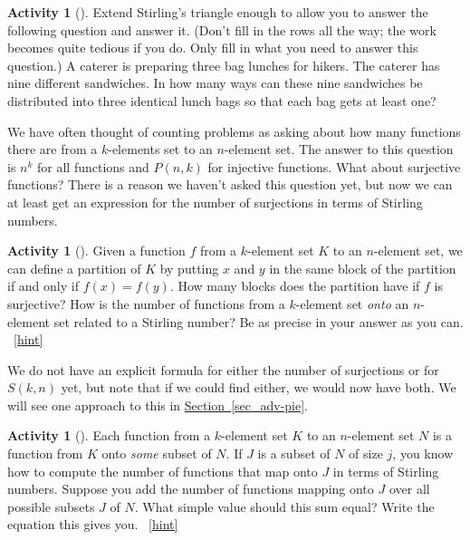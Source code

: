 \documentclass[10pt,]{book}
\theoremstyle{plain}
\theoremstyle{definition}
\theoremstyle{definition}
\theoremstyle{definition}
\newtheorem{activity}[project]{Activity}
\numberwithin{equation}{chapter}
\begin{document}
\begin{activity}[]\label{sandwiches}
\hypertarget{p-677}{}%
Extend Stirling's triangle enough to allow you to answer the following question and answer it. (Don't fill in the rows all the way; the work becomes quite tedious if you do. Only fill in what you need to answer this question.) A caterer is preparing three bag lunches for hikers. The caterer has nine different sandwiches. In how many ways can these nine sandwiches be distributed into three identical lunch bags so that each bag gets at least one?%
\end{activity}
\hypertarget{p-680}{}%
We have often thought of counting problems as asking about how many functions there are from a \(k\)-elements set to an \(n\)-element set.  The answer to this question is \(n^k\) for all functions and \(P(n,k)\) for injective functions.  What about surjective functions?  There is a reason we haven't asked this question yet, but now we can at least get an expression for the number of surjections in terms of Stirling numbers.%
\begin{activity}[]\label{activity-141}
\hypertarget{p-681}{}%
Given a function \(f\) from a \(k\)-element set \(K\) to an \(n\)-element set, we can define a partition of \(K\) by putting \(x\) and \(y\) in the same block of the partition if and only if \(f(x)=f(y)\). How many blocks does the partition have if \(f\) is surjective? How is the number of functions from a \(k\)-element set \emph{onto} an \(n\)-element set related to a Stirling number? Be as precise in your answer as you can.%
~\hfill{\tiny\hyperlink{a-141}{[hint]}\hypertarget{q-141}{}}\end{activity}
\hypertarget{p-684}{}%
We do not have an explicit formula for either the number of surjections or for \(S(k,n)\) yet, but note that if we could find either, we would now have both.  We will see one approach to this in \hyperref[sec_adv-pie]{Section~\ref{sec_adv-pie}}.%
\begin{activity}[]\label{Stirlingfalling}
\hypertarget{p-685}{}%
Each function from a \(k\)-element set \(K\) to an \(n\)-element set \(N\) is a function from \(K\) onto \emph{some} subset of \(N\). If \(J\) is a subset of \(N\) of size \(j\), you know how to compute the number of functions that map onto \(J\) in terms of Stirling numbers. Suppose you add the number of functions mapping onto \(J\) over all possible subsets \(J\) of \(N\). What simple value should this sum equal? Write the equation this gives you.%
~\hfill{\tiny\hyperlink{a-142}{[hint]}\hypertarget{q-142}{}}\end{activity}
\end{document}
